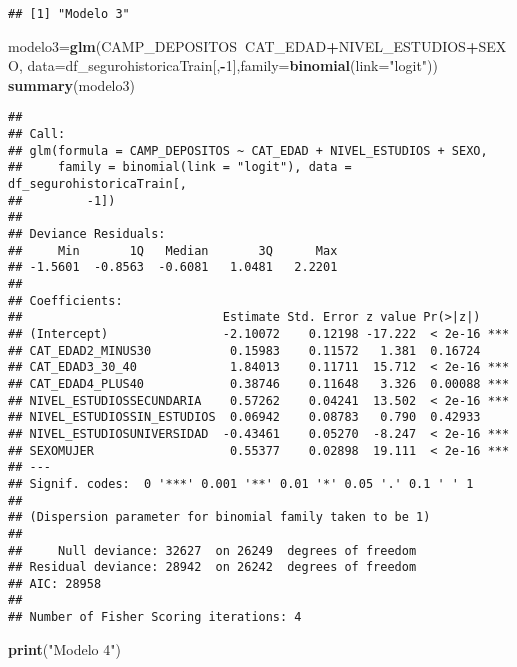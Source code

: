 \documentclass[]{article}
\newenvironment{Shaded}{\begin{snugshade}}{\end{snugshade}}
\newcommand{\KeywordTok}[1]{\textcolor[rgb]{0.13,0.29,0.53}{\textbf{#1}}}
\newcommand{\DataTypeTok}[1]{\textcolor[rgb]{0.13,0.29,0.53}{#1}}
\newcommand{\DecValTok}[1]{\textcolor[rgb]{0.00,0.00,0.81}{#1}}
\newcommand{\StringTok}[1]{\textcolor[rgb]{0.31,0.60,0.02}{#1}}
\newcommand{\OperatorTok}[1]{\textcolor[rgb]{0.81,0.36,0.00}{\textbf{#1}}}
\newcommand{\NormalTok}[1]{#1}
\begin{document}
\begin{verbatim}
## [1] "Modelo 3"
\end{verbatim}

\begin{Shaded}
\begin{Highlighting}[]
\NormalTok{modelo3=}\KeywordTok{glm}\NormalTok{(CAMP_DEPOSITOS}\OperatorTok{~}\NormalTok{CAT_EDAD}\OperatorTok{+}\NormalTok{NIVEL_ESTUDIOS}\OperatorTok{+}\NormalTok{SEXO, }\DataTypeTok{data=}\NormalTok{df_segurohistoricaTrain[,}\OperatorTok{-}\DecValTok{1}\NormalTok{],}\DataTypeTok{family=}\KeywordTok{binomial}\NormalTok{(}\DataTypeTok{link=}\StringTok{"logit"}\NormalTok{))}
\KeywordTok{summary}\NormalTok{(modelo3)}
\end{Highlighting}
\end{Shaded}

\begin{verbatim}
## 
## Call:
## glm(formula = CAMP_DEPOSITOS ~ CAT_EDAD + NIVEL_ESTUDIOS + SEXO, 
##     family = binomial(link = "logit"), data = df_segurohistoricaTrain[, 
##         -1])
## 
## Deviance Residuals: 
##     Min       1Q   Median       3Q      Max  
## -1.5601  -0.8563  -0.6081   1.0481   2.2201  
## 
## Coefficients:
##                            Estimate Std. Error z value Pr(>|z|)    
## (Intercept)                -2.10072    0.12198 -17.222  < 2e-16 ***
## CAT_EDAD2_MINUS30           0.15983    0.11572   1.381  0.16724    
## CAT_EDAD3_30_40             1.84013    0.11711  15.712  < 2e-16 ***
## CAT_EDAD4_PLUS40            0.38746    0.11648   3.326  0.00088 ***
## NIVEL_ESTUDIOSSECUNDARIA    0.57262    0.04241  13.502  < 2e-16 ***
## NIVEL_ESTUDIOSSIN_ESTUDIOS  0.06942    0.08783   0.790  0.42933    
## NIVEL_ESTUDIOSUNIVERSIDAD  -0.43461    0.05270  -8.247  < 2e-16 ***
## SEXOMUJER                   0.55377    0.02898  19.111  < 2e-16 ***
## ---
## Signif. codes:  0 '***' 0.001 '**' 0.01 '*' 0.05 '.' 0.1 ' ' 1
## 
## (Dispersion parameter for binomial family taken to be 1)
## 
##     Null deviance: 32627  on 26249  degrees of freedom
## Residual deviance: 28942  on 26242  degrees of freedom
## AIC: 28958
## 
## Number of Fisher Scoring iterations: 4
\end{verbatim}

\begin{Shaded}
\begin{Highlighting}[]
\KeywordTok{print}\NormalTok{(}\StringTok{"Modelo 4"}\NormalTok{)}
\end{Highlighting}
\end{Shaded}
\end{document}

